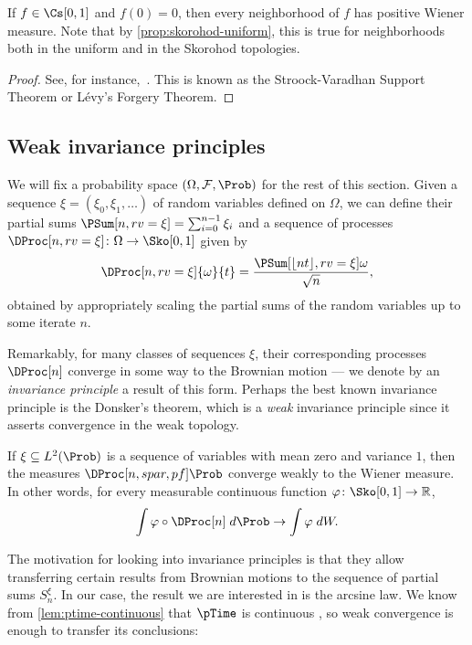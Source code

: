 \documentclass[../main]{subfiles}
\begin{document}
\begin{theorem}\label{thm:forgery}
  If \(f \in \CWPS\) and \(f(0) = 0\), then every neighborhood of \(f\) has positive Wiener measure. Note that by \cref{prop:skorohod-uniform}, this is true for neighborhoods both in the uniform and in the Skorohod topologies.
\end{theorem}

\begin{proof}
  See, for instance,~\cite{peresAnswerWienerMeasure2022}. This is known as the Stroock-Varadhan Support Theorem or Lévy's Forgery Theorem.
\end{proof}

\subsection{Weak invariance principles}

We will fix a probability space \((\Omega, \mathcal{F}, \Prob)\) for the rest of this section. Given a sequence \(\xi = (\xi_0,\xi_1,\dots)\) of random variables defined on \(\Omega\), we can define their partial sums \(\PSum[n,rv=\xi] = \sum_{i = 0}^{n - 1}\xi_i\) and a sequence of processes \(\DProc[n,rv=\xi] \colon \Omega \to \WPS\) given by
\[\DProc[n,rv=\xi]{\omega}{t} = \frac{\PSum[\floor{nt},rv=\xi]{\omega}}{\sqrt{n}},\]
obtained by appropriately scaling the partial sums of the random variables up to some iterate \(n\).

Remarkably, for many classes of sequences \(\xi\), their corresponding processes \(\DProc[n]\) converge in some way to the Brownian motion --- we denote by an \emph{invariance principle} a result of this form. Perhaps the best known invariance principle is the Donsker's theorem, which is a \emph{weak} invariance principle since it asserts convergence in the weak topology.

\begin{theorem}[Donsker]\label{thm:donsker}
  If \(\xi \subseteq L^2(\Prob)\) is a sequence of \iid variables with mean zero and variance \(1\), then the measures \(\DProc[n,spar,pf] \Prob\) converge weakly to the Wiener measure. In other words, for every measurable continuous function \(\varphi \colon \WPS \to \mathbb{R}\),
  \[\int \varphi \circ \DProc[n] \;d\Prob \to \int \varphi \;dW.\]
\end{theorem}

The motivation for looking into invariance principles is that they allow transferring certain results from Brownian motions to the sequence of partial sums \(S^{\xi}_n\). In our case, the result we are interested in is the arcsine law. We know from \cref{lem:ptime-continuous} that \(\pTime\) is continuous \almostevery, so weak convergence is enough to transfer its conclusions:
\end{document}
